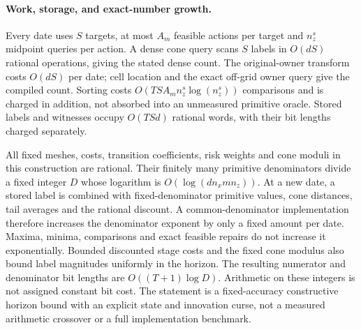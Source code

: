 \paragraph{Work, storage, and exact-number growth.}
Every date uses $S$ targets, at most $A_m$ feasible actions per target and $n_z^s$ midpoint queries per action. A dense cone query scans $S$ labels in $O(dS)$ rational operations, giving the stated dense count. The original-owner transform costs $O(dS)$ per date; cell location and the exact off-grid owner query give the compiled count. Sorting costs $O(TSA_mn_z^s\log(n_z^s))$ comparisons and is charged in addition, not absorbed into an unmeasured primitive oracle. Stored labels and witnesses occupy $O(TSd)$ rational words, with their bit lengths charged separately.

All fixed meshes, costs, transition coefficients, risk weights and cone moduli in this construction are rational. Their finitely many primitive denominators divide a fixed integer $D$ whose logarithm is $O(\log(d n_x m n_z))$. At a new date, a stored label is combined with fixed-denominator primitive values, cone distances, tail averages and the rational discount. A common-denominator implementation therefore increases the denominator exponent by only a fixed amount per date. Maxima, minima, comparisons and exact feasible repairs do not increase it exponentially. Bounded discounted stage costs and the fixed cone modulus also bound label magnitudes uniformly in the horizon. The resulting numerator and denominator bit lengths are $O((T+1)\log D)$. Arithmetic on these integers is not assigned constant bit cost. The statement is a fixed-accuracy constructive horizon bound with an explicit state and innovation curse, not a measured arithmetic crossover or a full implementation benchmark.
